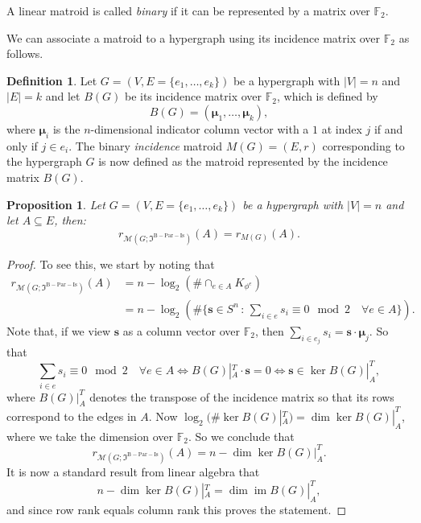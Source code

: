 \documentclass[11pt,reqno]{amsart}
\newcommand{\vecs}{\boldsymbol{s}}
\newcommand{\vecmu}{\boldsymbol{\mu}}
\newcommand{\Mo}{\mathcal{M}}
\newcommand{\mcib}{\mathfrak{I}^{\mathrm{B-Par-Is}}}
\theoremstyle{plain}
\newtheorem{proposition}[theorem]{Proposition}
\theoremstyle{definition}
\newtheorem{definition}[theorem]{Definition}
\numberwithin{equation}{section}
\begin{document}
A linear matroid is called \textit{binary} if it can be represented by a matrix over $\mathbb{F}_2$.

We can associate a matroid to a hypergraph using its incidence matrix over $\mathbb{F}_2$ as follows.
 
\begin{definition}
    Let $G = (V,E = \{e_1, \dots, e_k\})$ be a hypergraph with $|V| = n$ and $|E| = k$ and let $B(G)$ be its incidence matrix over $\mathbb{F}_2$, which is defined by
    \[ B(G) = (\vecmu_{1}, \dots, \vecmu_{k}),\]
    where $\vecmu_{i}$ is the $n$-dimensional indicator column vector with a $1$ at index $j$ if and only if $j \in e_i$. The binary \emph{incidence} matroid $M(G) = (E, r)$ corresponding to the hypergraph $G$ is now defined as the matroid represented by the incidence matrix $B(G)$.
\end{definition}


\begin{proposition}
\label{prop:parity_rank_equals_matroid}
    Let $G = (V,E = \{e_1, \dots, e_k \})$ be a hypergraph with $|V| = n$ and let $A \subseteq E$, then:
    \[ r_{\Mo(G; \mcib)}(A) = r_{M(G)}(A).\]
\end{proposition}
\begin{proof}
    To see this, we start by noting that 
    \begin{align*}
    r_{\Mo(G; \mcib)}(A) &= n- \log_2 (\# \cap_{e \in A} K_{\phi^e}) \\
    &= n - \log_2 \left(\# \{ \vecs \in S^n \, \colon \, \sum_{i \in e} s_i \equiv 0 \mod 2 \quad \forall e \in A \}\right).
    \end{align*}
    Note that, if we view $\vecs$ as a column vector over $\mathbb{F}_2$, then $\sum_{i \in e_j} s_i = \vecs \cdot \vecmu_j$. So that 
    \[ \sum_{i \in e} s_i \equiv 0 \mod 2 \quad \forall e \in A  \Leftrightarrow B(G)|_A^T \cdot \vecs = 0 \Leftrightarrow \vecs \in \ker B(G)|_A^T, \]
    where $B(G)|_A^T$ denotes the transpose of the incidence matrix so that its rows correspond to the edges in $A$. Now $\log_2 (\# \ker B(G)|_A^T) = \dim \ker B(G)|_A^T$, where we take the dimension over $\mathbb{F}_2$. So we conclude that 
    \[
    r_{\Mo(G; \mcib)}(A) = n-\dim \ker B(G)|_A^T.
    \]
    It is now a standard result from linear algebra that
    \[ n - \dim \ker B(G)|_A^T  = \dim \operatorname{im} B(G)|_A^T, \]
    and since row rank equals column rank this proves the statement.
\end{proof}
\end{document}

